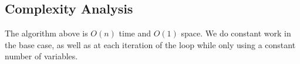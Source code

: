 \documentclass{bmcart}
\begin{document}
\subsection{Complexity Analysis}
The algorithm above is $O(n)$ time and $O(1)$ space. We do constant work in the base case, as well as at each iteration of the loop while only using a constant number of variables.
\end{document}
